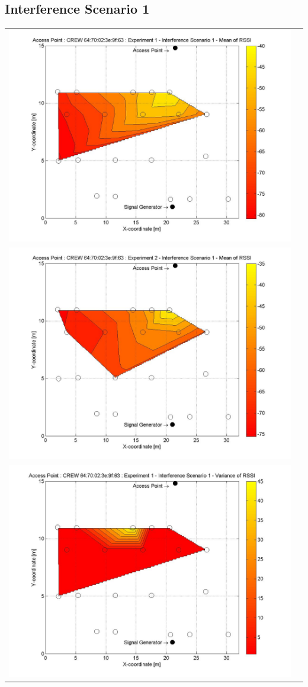 \documentclass[11pt,a4paper,headinclude,footinclude,chapterprefix=on]{scrreprt}
\begin{document}
\subsection{Interference Scenario 1} 
\begin{longtable}
	{lr} 
	\includegraphics[width=13cm]{../../Source/plot/CREW_63/63_Sig_Ex_1_Mean.jpg} \\
	\includegraphics[width=13cm]{../../Source/plot/CREW_63/63_Sig_Ex_2_Mean.jpg} \\
	\includegraphics[width=13cm]{../../Source/plot/CREW_63/63_Sig_Ex_1_Variance.jpg} \\

\end{longtable}
\end{document}
